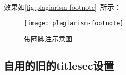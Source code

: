 \begin{latex}
\usepackage{xunicode-addon}
\newfontfamily{} %
\newCJKfontfamily{} %
\renewcommand\thefootnote{{\fnmarkfont\fnCJKmarkfont\textcircled{\arabic{footnote}}}}
\end{latex}

效果如\autoref{fig:plagiarism-footnote}~所示：

\begin{figure}[!htbp]
    \centering
    \texttt{[image: plagiarism-footnote]}
    \caption{带圈脚注示意图}
    \label{fig:plagiarism-footnote}
\end{figure}

\subsection{自用的旧的titlesec设置}




